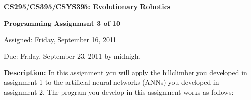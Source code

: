 \documentclass[12pt]{article}
\begin{document}
\centerline{\bf \Large CS295/CS395/CSYS395: \href{CS295_395_Syllabus.pdf}{\underline{Evolutionary Robotics}}}

\vspace{0.5cm}

\centerline{\bf \large Programming Assignment 3 of 10}

\vspace{0.5cm}

\centerline{\large Assigned: Friday, September 16, 2011}

\vspace{0.5cm}

\centerline{\large Due: Friday, September 23, 2011 by midnight}

\vspace{0.5cm}

\noindent \textbf{Description:} In this assignment you will apply the hillclimber you developed in assignment 1 to the artificial neural networks (ANNs) you developed in assignment 2. The program you develop in this assignment works as follows:
\end{document}
